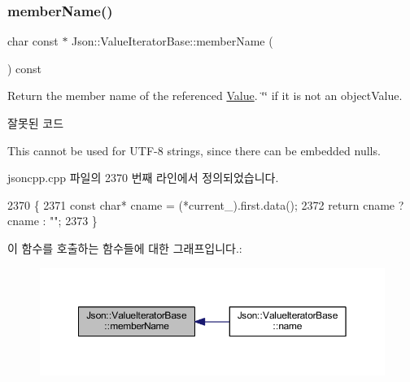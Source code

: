\subsubsection{\texorpdfstring{member\+Name()}{memberName()}\hspace{0.1cm}{\footnotesize\ttfamily [1/2]}}
{\footnotesize\ttfamily char const  $\ast$ Json\+::\+Value\+Iterator\+Base\+::member\+Name (\begin{DoxyParamCaption}{ }\end{DoxyParamCaption}) const\hspace{0.3cm}{\ttfamily [inherited]}}

Return the member name of the referenced \hyperlink{class_json_1_1_value}{Value}. \char`\"{}\char`\"{} if it is not an object\+Value. \begin{DoxyRefDesc}{잘못된 코드}
\item[\hyperlink{deprecated__deprecated000004}{잘못된 코드}]This cannot be used for U\+T\+F-\/8 strings, since there can be embedded nulls. \end{DoxyRefDesc}


jsoncpp.\+cpp 파일의 2370 번째 라인에서 정의되었습니다.


\begin{DoxyCode}
2370                                                 \{
2371   \textcolor{keyword}{const} \textcolor{keywordtype}{char}* cname = (*current\_).first.data();
2372   \textcolor{keywordflow}{return} cname ? cname : \textcolor{stringliteral}{""};
2373 \}
\end{DoxyCode}
이 함수를 호출하는 함수들에 대한 그래프입니다.\+:
\nopagebreak
\begin{figure}[H]
\begin{center}
\leavevmode
\includegraphics[width=350pt]{class_json_1_1_value_iterator_base_a54765da6759fd3f1edcbfbaf308ec263_icgraph}
\end{center}
\end{figure}
\mbox{\label{class_json_1_1_value_iterator_base_a391c9cbd0edf9a447b37df00e8ce6059}} 
